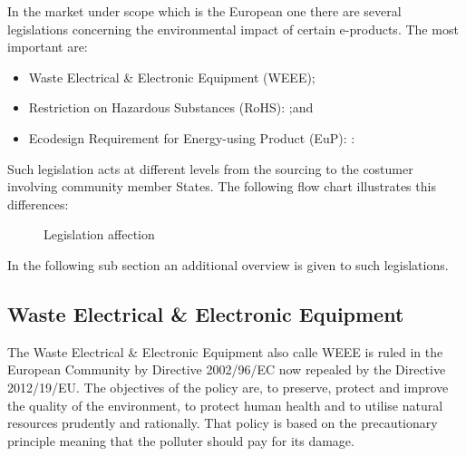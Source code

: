 \documentclass{article}
\begin{document}
In the market under scope which is the European one there are several legislations concerning the environmental impact of certain e-products. The most important are:
\begin{itemize}
    \item Waste Electrical \& Electronic Equipment (WEEE);
    \item Restriction on Hazardous Substances (RoHS): ;and
    \item Ecodesign Requirement for Energy-using Product (EuP): :
\end{itemize}

Such legislation acts at different levels from the sourcing to the costumer involving community member States. The following flow chart illustrates this differences:

\begin{figure}
\centering

\caption{Legislation affection}
\end{figure}



In the following sub section an additional overview is given to such legislations.

\subsection{Waste Electrical \& Electronic Equipment}
The Waste Electrical \& Electronic Equipment also calle WEEE is ruled in the European Community by Directive 2002/96/EC now repealed by the Directive 2012/19/EU. The objectives of the policy are, to preserve, protect and improve the quality of the environment, to protect human health and to utilise natural resources prudently and rationally. That policy is based on the precautionary principle meaning that the polluter should pay for its damage.
\end{document}
